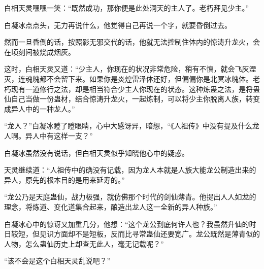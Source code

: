 \begin{this_body}
白相天灵嘿嘿一笑：“既然成功，那你便是此处洞天的主人了。老朽拜见少主。”

白凝冰点点头，无力再说什么，他觉得自己再说一个字，就要昏倒过去。

然而一旦昏倒的话，按照影无邪交代的话，他就无法控制住体内的惊涛升龙火，会在顷刻间被烧成烟灰。

这时，白相天灵又道：“少主人，你现在的状况非常危险，稍有不慎，就会飞灰湮灭，连魂魄都不会留下来。如果你是炎煌雷泽体还好，但偏偏你是北冥冰魄体。老朽现有一道修行之法，却是相当符合少主人你现在的状态。这种炼蛊之法，是将蛊仙自己当做一份蛊材，结合惊涛升龙火，一起炼制，可以将少主你脱离人族，转变成异人中的一种龙人。”

“龙人？”白凝冰瞪了瞪眼睛，心中大感讶异，暗想，“《人祖传》中没有提及什么龙人啊。异人中有这样一支？”

白凝冰虽然没有说话，但白相天灵似乎知晓他心中的疑惑。

天灵继续道：“人祖传中的确没有记载，因为龙人本就是人族大能龙公制造出来的异人，原先的根本目的是用来延寿的。”

“龙公乃是天庭蛊仙，战力极强，就仿佛那个时代的剑仙薄青。他提出人人如龙的理念，将炼道、变化道集合起来，酿造出龙人这一全新的异人种族。”

白凝冰心中的惊讶又加重几分，他想：“这个龙公到底何许人也？我虽然升仙的时日较短，但见识方面却不是短板，反而比寻常蛊仙还要宽广。龙公既然是薄青似的人物，怎么蛊仙历史上却查无此人，毫无记载呢？”

“该不会是这个白相天灵乱说吧？”

\end{this_body}

